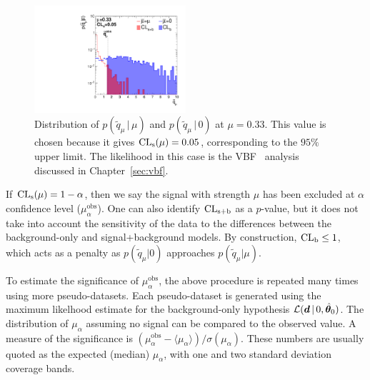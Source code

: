 \begin{figure}[]
    \begin{center}
        \includegraphics[width=0.5\textwidth]{figures/cls/cls.pdf}
        \caption{Distribution of $p(\tilde q_\mu\,|\,\mu)$ and $p(\tilde q_\mu\,|\,0)$ at $\mu = 0.33$. 
                 This value is chosen because it gives $\operatorname{\mathrm{CL}_s}(\mu) = 0.05$, corresponding to the $95\%$ upper limit.
                 The likelihood in this case is the VBF \hinv~analysis discussed in Chapter~\ref{sec:vbf}.}
        \label{fig:cls:cls}
    \end{center}
\end{figure}

If $\operatorname{\mathrm{CL}_s}(\mu) = 1-\alpha$, then we say the signal with strength $\mu$ has been excluded at $\alpha$ confidence level ($\mu_\alpha^\mathrm{obs}$).
One can also identify $\operatorname{\mathrm{CL}_{s+b}}$ as a $p$-value, but it does not take into account the sensitivity of the data to the differences between the background-only and signal+background models.
By construction, $\operatorname{\mathrm{CL}_b} \leq 1$, which acts as a penalty as $p(\tilde q_\mu | 0)$ approaches $p(\tilde q_\mu | \mu)$.

To estimate the significance of $\mu_\alpha^\mathrm{obs}$, the above procedure is repeated many times using more pseudo-datasets.
Each pseudo-dataset is generated using the maximum likelhood estimate for the background-only hypothesis $\mathcal{L}(\bm{d}\,|\,0,\hat{\bm{\theta}}_0)$.
The distribution of $\mu_\alpha$ assuming no signal can be compared to the observed value.
A measure of the significance is $(\mu_\alpha^\mathrm{obs} - \langle\mu_\alpha\rangle) / \sigma(\mu_\alpha)$.
These numbers are usually quoted as the expected (median) $\mu_\alpha$, with one and two standard deviation coverage bands.

